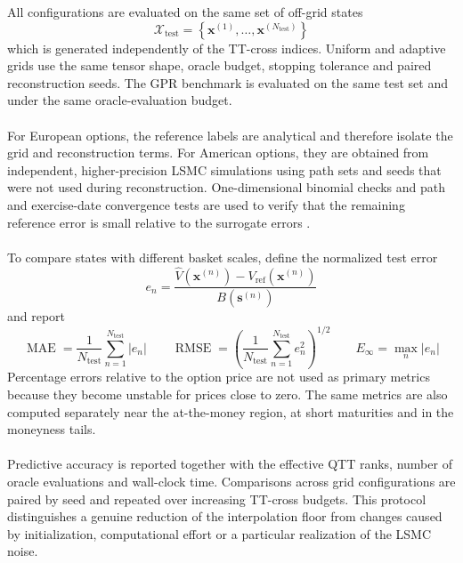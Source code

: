 \documentclass{article}
\numberwithin{equation}{subsection}
\theoremstyle{definition}
\theoremstyle{remark}
\begin{document}
All configurations are evaluated on the same set of off-grid states
\[
\mathcal{X}_{\mathrm{test}}
=
\left\{
\boldsymbol{x}^{(1)},\ldots,\boldsymbol{x}^{(N_{\mathrm{test}})}
\right\}
\]
which is generated independently of the TT-cross indices. Uniform and adaptive
grids use the same tensor shape, oracle budget, stopping tolerance and paired
reconstruction seeds. The GPR benchmark is evaluated on the same test set and
under the same oracle-evaluation budget.\\
\\
For European options, the reference labels are analytical and therefore isolate
the grid and reconstruction terms. For American options, they are obtained
from independent, higher-precision LSMC simulations using path sets and seeds
that were not used during reconstruction. One-dimensional binomial checks and
path and exercise-date convergence tests are used to verify that the remaining
reference error is small relative to the surrogate errors
\cite{longstaff2001leastSquares,glasserman2004montecarlo}.\\
\\
To compare states with different basket scales, define the normalized test
error
\begin{equation}
e_n
=
\frac{
\widehat V\left(\boldsymbol{x}^{(n)}\right)
-
V_{\mathrm{ref}}\left(\boldsymbol{x}^{(n)}\right)
}{
B\left(\boldsymbol{s}^{(n)}\right)
}
\label{eq:normalized-test-error}
\end{equation}
and report
\begin{equation}
\operatorname{MAE}
=
\frac{1}{N_{\mathrm{test}}}
\sum_{n=1}^{N_{\mathrm{test}}}|e_n|
\qquad
\operatorname{RMSE}
=
\left(
\frac{1}{N_{\mathrm{test}}}
\sum_{n=1}^{N_{\mathrm{test}}}e_n^2
\right)^{1/2}
\qquad
E_{\infty}
=
\max_n|e_n|
\label{eq:error-metrics}
\end{equation}
Percentage errors relative to the option price are not used as primary metrics
because they become unstable for prices close to zero. The same metrics are
also computed separately near the at-the-money region, at short maturities and
in the moneyness tails.\\
\\
Predictive accuracy is reported together with the effective QTT ranks, number
of oracle evaluations and wall-clock time. Comparisons across grid
configurations are paired by seed and repeated over increasing TT-cross
budgets. This protocol distinguishes a genuine reduction of the interpolation
floor from changes caused by initialization, computational effort or a
particular realization of the LSMC noise.
\end{document}
